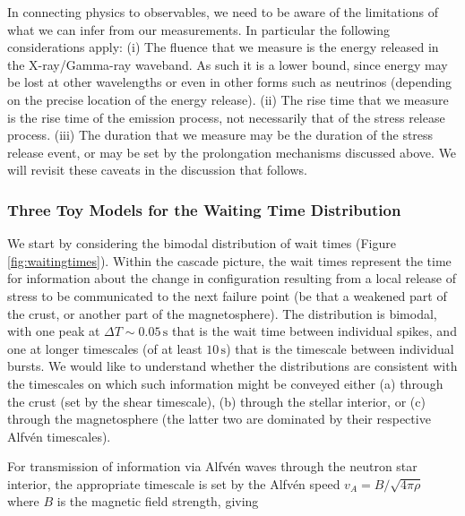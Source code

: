 \documentclass[12pt]{emulateapj}
\begin{document}
In connecting physics to observables, we need to be aware of the limitations of what we can infer from our measurements. In particular the following 
considerations apply: (i) The fluence that we measure is the energy released in the X-ray/Gamma-ray waveband. As such it is a lower bound, since 
energy may be lost at other wavelengths or even in other forms such as neutrinos (depending on the precise location of the energy release). (ii) The
 rise time that we measure is the rise time of the emission process, not necessarily that of the stress release process. (iii) The duration that we measure 
 may be the duration of the stress release event, or may be set by the prolongation mechanisms discussed above. We will revisit these caveats in the 
 discussion that follows.

\subsubsection{Three Toy Models for the Waiting Time Distribution}

We start by considering the bimodal distribution of wait times (Figure \ref{fig:waitingtimes}). Within the cascade picture, the wait times represent the 
time for information about the change in configuration resulting from a local release of stress to be communicated to the next failure point (be that a 
weakened part of the crust, or another part of the magnetosphere). The distribution is bimodal, with one peak at $\Delta T\sim 0.05\,\mathrm{s}$ that 
is the wait time between individual spikes, and one at longer timescales (of at least $10\,\mathrm{s}$) that is the timescale between individual bursts. 
We would like to understand whether the distributions are consistent with the timescales on which such information might be conveyed either (a) through 
the crust (set by the shear timescale), (b) through the stellar interior, or (c) through the magnetosphere (the latter two are dominated by their respective Alfv\'en timescales).

For transmission of information via Alfv\'en waves through the neutron star interior, the appropriate timescale is set by the Alfv\'en speed 
$v_A = B/\sqrt{4\pi\rho}$ where $B$ is the magnetic field strength, giving
\end{document}
